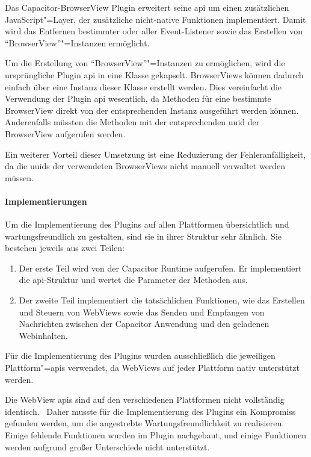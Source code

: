 Das Capacitor-BrowserView Plugin erweitert seine \ac{api} um einen zusätzlichen JavaScript"=Layer, der zusätzliche nicht-native Funktionen implementiert.
Damit wird das Entfernen bestimmter oder aller Event-Listener sowie das Erstellen von \enquote{BrowserView}"=Instanzen ermöglicht.

Um die Erstellung von \enquote{BrowserView}"=Instanzen zu ermöglichen, wird die ursprüngliche Plugin \ac{api} in eine Klasse gekapselt.
BrowserViews können dadurch einfach über eine Instanz dieser Klasse erstellt werden.
Dies vereinfacht die Verwendung der Plugin \ac{api} wesentlich, da Methoden für eine bestimmte BrowserView direkt von der entsprechenden Instanz ausgeführt werden können.
Anderenfalls müssten die Methoden mit der entsprechenden \ac{uuid} der BrowserView aufgerufen werden.

Ein weiterer Vorteil dieser Umsetzung ist eine Reduzierung der Fehleranfälligkeit, da die \acp{uuid} der verwendeten BrowserViews nicht manuell verwaltet werden müssen.

\newpage

\paragraph{Implementierungen}

Um die Implementierung des Plugins auf allen Plattformen übersichtlich und wartungsfreundlich zu gestalten, sind sie in ihrer Struktur sehr ähnlich.
Sie bestehen jeweils aus zwei Teilen:

\begin{enumerate}
    \item 
    Der erste Teil wird von der Capacitor Runtime aufgerufen.
    Er implementiert die \acs{api}-Struktur und wertet die Parameter der Methoden aus.
    \item
    Der zweite Teil implementiert die tatsächlichen Funktionen, wie das Erstellen und Steuern von WebViews
    sowie das Senden und Empfangen von Nachrichten zwischen der Capacitor Anwendung und den geladenen Webinhalten.
\end{enumerate}

Für die Implementierung des Plugins wurden ausschließlich die jeweiligen Plattform"=\acsp{api} verwendet, da WebViews auf jeder Plattform nativ unterstützt werden.
\cite{android:api, ios:api, electron:docs}

Die WebView \acsp{api} sind auf den verschiedenen Plattformen nicht vollständig identisch.~\cite{android:api, electron:docs}
Daher musste für die Implementierung des Plugins ein Kompromiss gefunden werden, um die angestrebte Wartungsfreundlichkeit zu realisieren.
Einige fehlende Funktionen wurden im Plugin nachgebaut, und einige Funktionen werden aufgrund großer Unterschiede nicht unterstützt.

